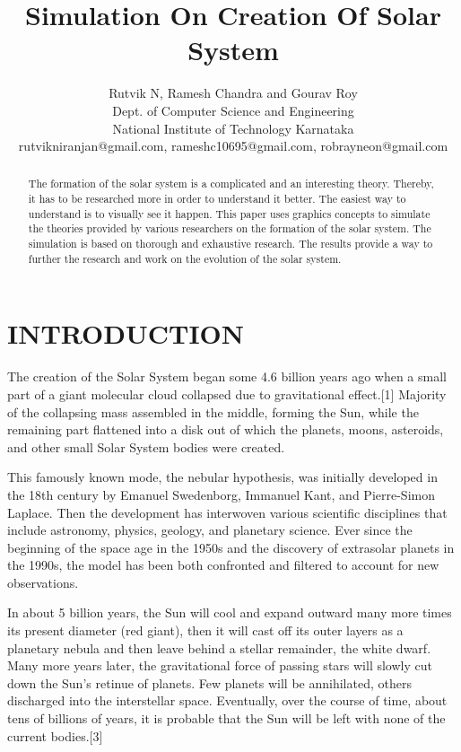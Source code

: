 \documentclass[letterpaper, 10 pt, conference]{ieeeconf}  %
\title{\LARGE \bf
Simulation On Creation Of Solar System
}
\author{Rutvik N, Ramesh Chandra and Gourav Roy \\ Dept. of Computer Science and Engineering\\ National Institute of Technology Karnataka\\ rutvikniranjan@gmail.com, rameshc10695@gmail.com, robrayneon@gmail.com
}
\begin{document}
\maketitle
\thispagestyle{empty}
\pagestyle{empty}


\begin{abstract}
The formation of the solar system is a complicated and an interesting theory. Thereby, it has to be researched more in order to understand it better. The easiest way to understand is to visually see it happen. This paper uses graphics concepts to simulate the theories provided by various researchers on the formation of the solar system. The simulation is based on thorough and exhaustive research. The results provide a way to further the research and work on the evolution of the solar system.    

\end{abstract}


\section{INTRODUCTION}
The creation of the Solar System began some 4.6 billion years ago when a small part of a giant molecular cloud collapsed due to gravitational effect.[1] Majority of the collapsing mass assembled in the middle, forming the Sun, while the remaining part flattened into a disk out of which the planets, moons, asteroids, and other small Solar System bodies were created.

This famously known mode, the nebular hypothesis, was initially developed in the 18th century by Emanuel Swedenborg, Immanuel Kant, and Pierre-Simon Laplace. Then the development has interwoven various scientific disciplines that include astronomy, physics, geology, and planetary science. Ever since the beginning of the space age in the 1950s and the discovery of extrasolar planets in the 1990s, the model has been both confronted and filtered to account for new observations.

In about 5 billion years, the Sun will cool and expand outward many more times its present diameter (red giant), then it will cast off its outer layers as a planetary nebula and then leave behind a stellar remainder, the white dwarf. Many more years later, the gravitational force of passing stars will slowly cut down the Sun's retinue of planets. Few planets will be annihilated, others discharged into the interstellar space. Eventually, over the course of time, about tens of billions of years, it is probable that the Sun will be left with none of the current bodies.[3]
\end{document}
